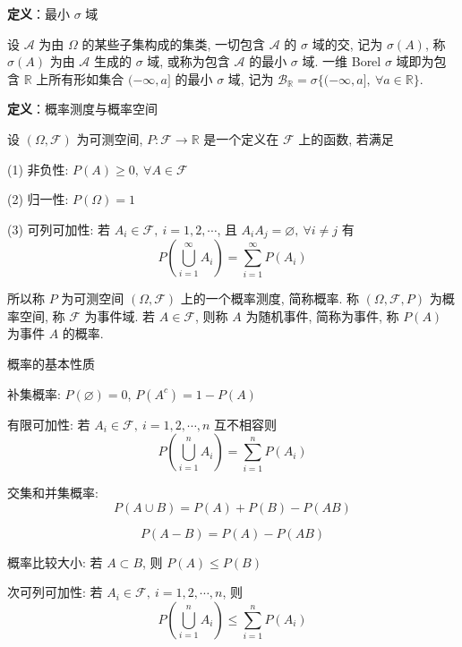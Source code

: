\documentclass[openany]{ctexbook}
\theoremstyle{kaiti}
\theoremstyle{normal}
\begin{document}
\textbf{定义}：最小 $\sigma$ 域

设 $\mathcal{A}$ 为由 $\Omega$ 的某些子集构成的集类, 一切包含 $\mathcal{A}$ 的 $\sigma$ 域的交, 记为 $\sigma(A)$, 称 $\sigma(A)$ 为由 $\mathcal{A}$ 生成的 $\sigma$ 域, 或称为包含 $\mathcal{A}$ 的最小 $\sigma$ 域. 一维 Borel $\sigma$ 域即为包含 $\mathbb{R}$ 上所有形如集合 $(-\infty,a]$ 的最小 $\sigma$ 域, 记为 $\mathcal{B}_{\mathbb{R}}=\sigma\{(-\infty,a],~\forall a\in\mathbb{R}\}$.

\textbf{定义}：概率测度与概率空间

设 $(\Omega,\mathcal{F})$ 为可测空间, $P:\mathcal{F}\to\mathbb{R}$ 是一个定义在 $\mathcal{F}$ 上的函数, 若满足

(1) 非负性: $P(A)\geqslant0,~\forall A\in\mathcal{F}$

(2) 归一性: $P(\Omega)=1$

(3) 可列可加性: 若 $A_i\in\mathcal{F},~i=1,2,\cdots$, 且 $A_iA_j=\varnothing,~\forall i\neq j$ 有
\begin{equation}
  P\left(\bigcup_{i=1}^\infty A_i\right)=\sum_{i=1}^\infty P(A_i)
\end{equation}
 
所以称 $P$ 为可测空间 $(\Omega,\mathcal{F})$ 上的一个概率测度, 简称概率. 称 $(\Omega,\mathcal{F},P)$ 为概率空间, 称 $\mathcal{F}$ 为事件域. 若 $A\in\mathcal{F}$, 则称 $A$ 为随机事件, 简称为事件, 称 $P(A)$ 为事件 $A$ 的概率.

概率的基本性质

补集概率: $P(\varnothing)=0$, $P(A^c)=1-P(A)$

有限可加性: 若 $A_i\in\mathcal{F},~i=1,2,\cdots,n$ 互不相容则
\begin{equation}
  P\left(\bigcup_{i=1}^n A_i\right)=\sum_{i=1}^n P(A_i)
\end{equation}


交集和并集概率:
\begin{equation}
  P(A\cup B)=P(A)+P(B)-P(AB)
\end{equation}

\begin{equation}
  P(A-B)=P(A)-P(AB)
\end{equation}


概率比较大小: 若 $A\subset B$, 则 $P(A)\leqslant P(B)$

次可列可加性: 若 $A_i\in\mathcal{F},~i=1,2,\cdots,n$, 则
\begin{equation}
  P\left(\bigcup_{i=1}^n A_i\right)\leqslant\sum_{i=1}^n P(A_i)
\end{equation}
\end{document}
